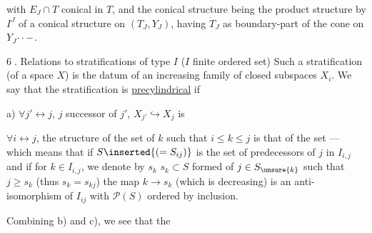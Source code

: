 with $E_J\cap T$ conical in $T$, and the conical structure
 being the product structure by $I^J$ of
a conical structure on $(T_J,Y_J)$, having
$\dot T_J$ as boundary-part of the cone on $Y_J$\(\mathinner{\cdotp\cdotp-}\).


\textcircled{6.} Relations to stratifications of type $I$
($I$ finite ordered set)
Such a stratification (of a space $X$) is
the datum of an increasing family of
closed subspaces $X_i$. We say that
the stratification is \uline{precylindrical} if

a) $\forall j'\leftrightarrow j$, $j$ successor of $j'$,
$X_{j'}\hookrightarrow X_j$ is
 



$\forall i\leftrightarrow j$, the structure of the set 
of $k$ such that $i\le k\le j$ is that of the set
  --- which means that
if $S\inserted{(=S_{ij})}$ is the set of predecessors of $j$ in
$I_{i,j}$ 
and if for \unsure{$\forall$} $k\in I_{i,j}$, we denote
 by $s_k$   $s_k\subset S$ formed
of $j\in S_{\unsure{k}}$ such that
$j\ge s_k$ (thus $s_k=s_{kj}$)
the map $k\longrightarrow s_k$ (which is decreasing)
is an anti-isomorphism of $I_{ij}$ with $\mathcal P(S)$
ordered by inclusion. 




Combining b) and c), we see that the
